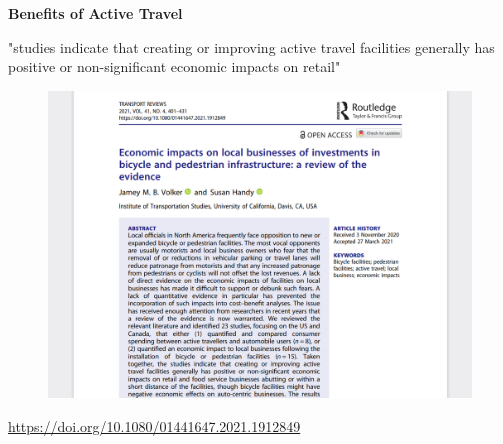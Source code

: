\documentclass[aspectratio=169]{beamer}
\begin{document}
\begin{frame}
	
	\textbf{Benefits of Active Travel}
	
	\vspace{4mm}
	
	\small{"studies indicate that creating or improving active travel facilities generally has positive or non-significant economic impacts on retail"}
	
	\begin{figure}
		\centering
		\includegraphics[width=0.6\linewidth]{images/economic_impacts_active_travel.png}
	\end{figure}
	
	\tiny\url{https://doi.org/10.1080/01441647.2021.1912849}
	
\end{frame}
\end{document}
